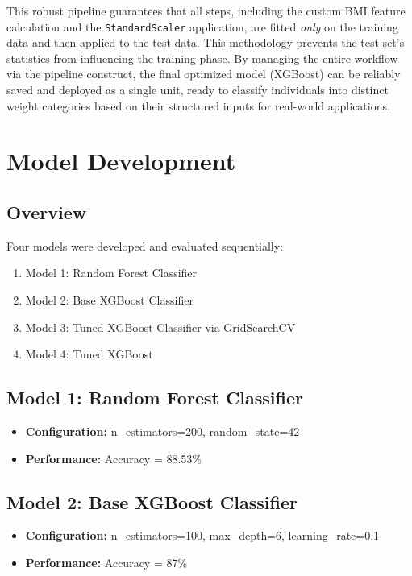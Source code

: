 \documentclass[12pt,a4paper]{report}
\begin{document}
This robust pipeline guarantees that all steps, including the custom BMI feature calculation and the \verb|StandardScaler| application, are fitted \textit{only} on the training data and then applied to the test data. This methodology prevents the test set's statistics from influencing the training phase. By managing the entire workflow via the pipeline construct, the final optimized model (XGBoost) can be reliably saved and deployed as a single unit, ready to classify individuals into distinct weight categories based on their structured inputs for real-world applications.

\chapter{Model Development}

\section{Overview}
Four models were developed and evaluated sequentially:
\begin{enumerate}
    \item Model 1: Random Forest Classifier
    \item Model 2: Base XGBoost Classifier
    \item Model 3: Tuned XGBoost Classifier via GridSearchCV
    \item Model 4: Tuned XGBoost
\end{enumerate}

\section{Model 1: Random Forest Classifier}
\begin{itemize}
    \item \textbf{Configuration:} n\_estimators=200, random\_state=42
    \item \textbf{Performance:} Accuracy = 88.53\%
\end{itemize}

\section{Model 2: Base XGBoost Classifier}
\begin{itemize}
    \item \textbf{Configuration:} n\_estimators=100, max\_depth=6, learning\_rate=0.1
    \item \textbf{Performance:} Accuracy = 87\%
\end{itemize}
\end{document}

